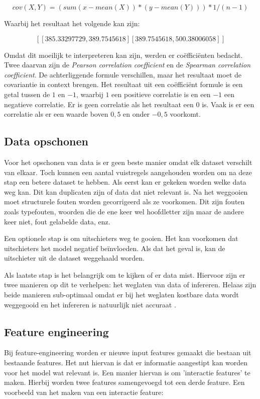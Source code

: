 \[cov(X, Y) = (sum (x - mean(X)) * (y - mean(Y)) ) * 1/(n-1)\]

Waarbij het resultaat het volgende kan zijn:

\[[[385.33297729, 389.7545618] [389.7545618, 500.38006058]]\]

Omdat dit moeilijk te interpreteren kan zijn, werden er coëfficiënten bedacht. Twee daarvan zijn de \textit{Pearson correlation coefficient} en de \textit{Spearman correlation coefficient}. De achterliggende formule verschillen, maar het resultaat moet de \gls{covariantie} in context brengen. Het resultaat uit een coëfficiënt formule is een getal tussen de \(1\) en \(-1\), waarbij \(1\) een positieve correlatie is en een \(-1\) een negatieve correlatie. Er is geen correlatie als het resultaat een \(0\) is. Vaak is er een correlatie als er een waarde boven \(0,5\) en onder \(-0,5\) voorkomt.

\subsection{Data opschonen}\label{subsec:data-opschonen}
Voor het opschonen van data is er geen beste manier omdat elk dataset verschilt van elkaar. Toch kunnen een aantal vuistregels aangehouden worden om na deze stap een betere dataset te hebben. Als eerst kan er gekeken worden welke data weg kan. Dit kan duplicaten zijn of data dat niet relevant is. Na het weggooien moet structurele fouten worden gecorrigeerd als ze voorkomen. Dit zijn fouten zoals typefouten, woorden die de ene keer wel hoofdletter zijn maar de andere keer niet, fout gelabelde data, enz.

Een optionele stap is om uitschieters weg te gooien. Het kan voorkomen dat uitschieters het model negatief beïnvloeden. Als dat het geval is, kan de uitschieter uit de dataset weggehaald worden.  

Als laatste stap is het belangrijk om te kijken of er data mist. Hiervoor zijn er twee manieren op dit te verhelpen: het weglaten van data of infereren. Helaas zijn beide manieren sub-optimaal omdat er bij het weglaten kostbare data wordt weggegooid en het infereren is natuurlijk niet accuraat \cite{data-science-primer}.

\subsection{Feature engineering}\label{subsec:feature-engineering}
Bij \gls{feature-engineering} worden er nieuwe input features gemaakt die bestaan uit bestaande features. Het nut hiervan is dat er informatie aangestipt kan worden voor het model wat relevant is. Een manier hiervan is om 'interactie features' te maken. Hierbij worden twee features samengevoegd tot een derde feature. Een voorbeeld van het maken van een interactie feature:

